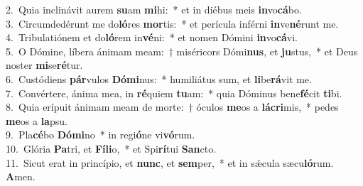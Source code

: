 {2.~}Quia inclinávit aurem \textbf{su}am \textbf{mi}hi:~* et in diébus meis \textbf{in}vo\textbf{cá}bo.\\
{3.~}Circumdedérunt me do\textbf{ló}res \textbf{mor}tis:~* et perícula inférni \textbf{in}ve\textbf{né}runt me.\\
{4.~}Tribulatiónem et do\textbf{ló}rem in\textbf{vé}ni:~* et nomen Dómini \textbf{in}vo\textbf{cá}vi.\\
{5.~}O Dómine, líbera ánimam meam:~† miséricors Dómi\textbf{nus}, et \textbf{ju}stus,~* et Deus noster \textbf{mi}se\textbf{ré}tur.\\
{6.~}Custódiens \textbf{pár}vulos \textbf{Dó}\textbf{mi}nus:~* humiliátus sum, et \textbf{li}be\textbf{rá}vit me.\\
{7.~}Convértere, ánima mea, in \textbf{ré}quiem \textbf{tu}am:~* quia Dóminus bene\textbf{fé}cit \textbf{ti}bi.\\
{8.~}Quia erípuit ánimam meam de morte:~† óculos \textbf{me}os a \textbf{lá}\textbf{cri}mis,~* pedes \textbf{me}os a \textbf{la}psu.\\
{9.~}Pla\textbf{cé}bo \textbf{Dó}\textbf{mi}no~* in regi\textbf{ó}ne vi\textbf{vó}rum.\\
{10.~}Glória \textbf{Pa}tri, et \textbf{Fí}\textbf{li}o,~* et Spi\textbf{rí}tui \textbf{San}cto.\\
{11.~}Sicut erat in princípio, et \textbf{nunc}, et \textbf{sem}per,~* et in sǽcula sæcu\textbf{ló}rum. \textbf{A}men.\\
